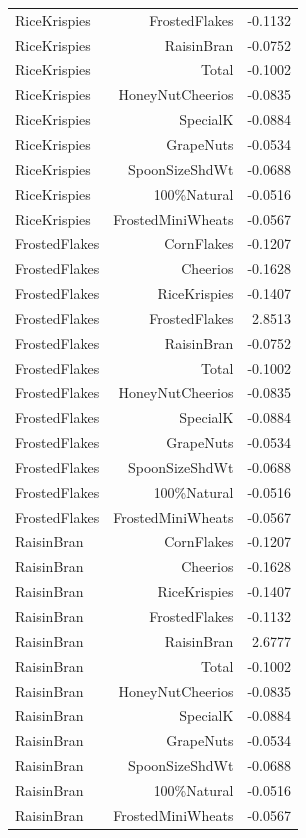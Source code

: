 \begin{longtable}{@{}lrr@{}}
RiceKrispies & FrostedFlakes & -0.1132 \\
RiceKrispies & RaisinBran & -0.0752 \\
RiceKrispies & Total & -0.1002 \\
RiceKrispies & HoneyNutCheerios & -0.0835 \\
RiceKrispies & SpecialK & -0.0884 \\
RiceKrispies & GrapeNuts & -0.0534 \\
RiceKrispies & SpoonSizeShdWt & -0.0688 \\
RiceKrispies & 100\%Natural & -0.0516 \\
RiceKrispies & FrostedMiniWheats & -0.0567 \\
FrostedFlakes & CornFlakes & -0.1207 \\
FrostedFlakes & Cheerios & -0.1628 \\
FrostedFlakes & RiceKrispies & -0.1407 \\
FrostedFlakes & FrostedFlakes & 2.8513 \\
FrostedFlakes & RaisinBran & -0.0752 \\
FrostedFlakes & Total & -0.1002 \\
FrostedFlakes & HoneyNutCheerios & -0.0835 \\
FrostedFlakes & SpecialK & -0.0884 \\
FrostedFlakes & GrapeNuts & -0.0534 \\
FrostedFlakes & SpoonSizeShdWt & -0.0688 \\
FrostedFlakes & 100\%Natural & -0.0516 \\
FrostedFlakes & FrostedMiniWheats & -0.0567 \\
RaisinBran & CornFlakes & -0.1207 \\
RaisinBran & Cheerios & -0.1628 \\
RaisinBran & RiceKrispies & -0.1407 \\
RaisinBran & FrostedFlakes & -0.1132 \\
RaisinBran & RaisinBran & 2.6777 \\
RaisinBran & Total & -0.1002 \\
RaisinBran & HoneyNutCheerios & -0.0835 \\
RaisinBran & SpecialK & -0.0884 \\
RaisinBran & GrapeNuts & -0.0534 \\
RaisinBran & SpoonSizeShdWt & -0.0688 \\
RaisinBran & 100\%Natural & -0.0516 \\
RaisinBran & FrostedMiniWheats & -0.0567 \\

\end{longtable}
